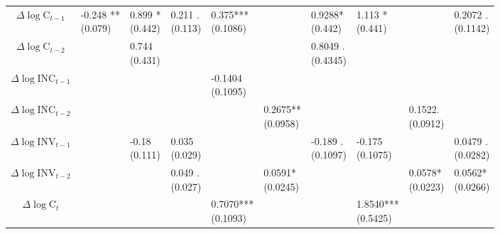 \begin{landscape}
\begin{table}[ht!]
{\begin{tabular}{c lll lll lll}
    \midrule
    
    $\Delta\log\text{C}_{t-1}$ &
    \makecell{-0.248 **\\ (0.079)}  & \makecell{0.899 *\\ (0.442)} & \makecell{0.211 .\\ (0.113)}&
    \makecell{0.375***\\ (0.1086)} &  &\makecell{0.9288*\\ (0.442)} &
    \makecell{1.113 *\\ (0.441)}&
    &  \makecell{0.2072 . \\ (0.1142)}\\
    
    $\Delta\log\text{C}_{t-2}$
    & & \makecell{0.744 \\ (0.431)} & & & & \makecell{0.8049 . \\ (0.4345)}& & & \\
    
    $\Delta\log\text{INC}_{t-1}$ &
    & & & \makecell{-0.1404\\ (0.1095)} &  & &
    & & \\
    
    $\Delta\log\text{INC}_{t-2}$ &
    & & 
    & &\makecell{0.2675**\\ (0.0958)} &
    & &\makecell{0.1522.\\ (0.0912)} & \\
    
    $\Delta\log\text{INV}_{t-1}$ &
    & \makecell{-0.18\\ (0.111)} & \makecell{0.035\\ (0.029)} &
    & & \makecell{-0.189 . \\ (0.1097)} &
    \makecell{-0.175\\ (0.1075)} &
    &  \makecell{0.0479 . \\ (0.0282)} \\
    
    $\Delta\log\text{INV}_{t-2}$ &
     & &
    \makecell{0.049 .\\ (0.027) }& & \makecell{0.0591*\\ (0.0245) }&
    & &\makecell{0.0578*\\ (0.0223) } & \makecell{0.0562*\\ (0.0266)} \\
    
    \midrule
    
    $\Delta\log\text{C}_t$ &
    & & &
    \makecell{0.7070***\\ (0.1093)} & & & 
    \makecell{1.8540***\\ (0.5425)} & & \\
    

\end{tabular}}
\end{table}
\end{landscape}
